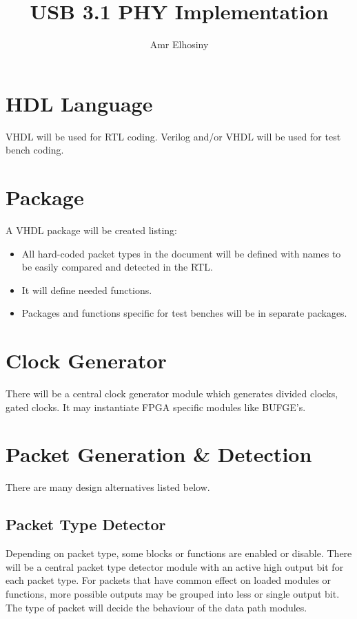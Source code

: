 \documentclass[11pt,a4paper]{article}
\author{Amr Elhosiny}
\begin{document}
\title{USB 3.1 PHY Implementation}

\maketitle

\section{HDL Language}
VHDL will be used for RTL coding. Verilog and/or VHDL will be used for test bench coding.



\section{Package}
A VHDL package will be created listing:
\begin{itemize}
	\item All hard-coded packet types in the document will be defined with names to be easily compared and detected in the RTL.
	\item It will define needed functions.
	\item Packages and functions specific for test benches will be in separate packages.
\end{itemize}

\section{Clock Generator}
There will be a central clock generator module which generates divided clocks, gated clocks. It may instantiate FPGA specific modules like BUFGE's.

\section{Packet Generation \& Detection}

There are many design alternatives listed below.

\subsection{Packet Type Detector}
Depending on packet type, some blocks or functions are enabled or disable. There will be a central packet type detector module with an active high output bit for each packet type. For packets that have common effect on loaded modules or functions, more possible outputs may be grouped into less or single output bit.
The type of packet will decide the behaviour of the data path modules.
\end{document}
